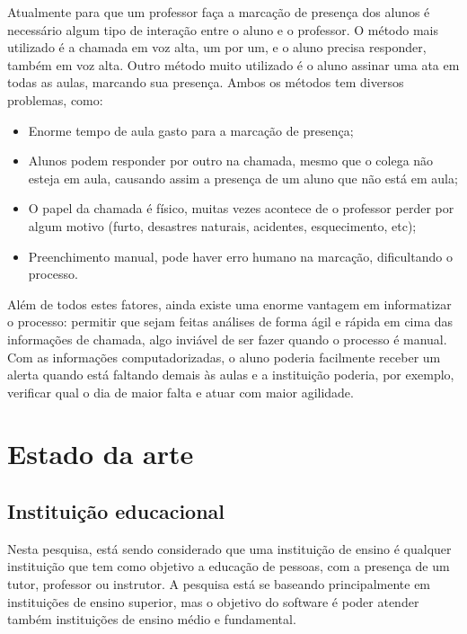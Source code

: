 \documentclass[
	12pt,
	oneside,
	a4paper,
	english,
	brazil,
]{abntex2}
\begin{document}
Atualmente para que um professor faça a marcação de presença dos alunos é necessário algum tipo de interação entre o aluno e o professor. O método mais utilizado é a chamada em voz alta, um por um, e o aluno precisa responder, também em voz alta. Outro método muito utilizado é o aluno assinar uma ata em todas as aulas, marcando sua presença. Ambos os métodos tem diversos problemas, como:

\begin{itemize}
    \item Enorme tempo de aula gasto para a marcação de presença;
    \item Alunos podem responder por outro na chamada, mesmo que o colega não esteja em aula, causando assim a presença de um aluno que não está em aula;
    \item O papel da chamada é físico, muitas vezes acontece de o professor perder por algum motivo (furto, desastres naturais, acidentes, esquecimento, etc);
    \item Preenchimento manual, pode haver erro humano na marcação, dificultando o processo.
\end{itemize}

Além de todos estes fatores, ainda existe uma enorme vantagem em informatizar o processo: permitir que sejam feitas análises de forma ágil e rápida em cima das informações de chamada, algo inviável de ser fazer quando o processo é manual. Com as informações computadorizadas, o aluno poderia facilmente receber um alerta quando está faltando demais às aulas e a instituição poderia, por exemplo, verificar qual o dia de maior falta e atuar com maior agilidade.



\chapter{Estado da arte}

\section{Instituição educacional}

Nesta pesquisa, está sendo considerado que uma instituição de ensino é qualquer instituição que tem como objetivo a educação de pessoas, com a presença de um tutor, professor ou instrutor. A pesquisa está se baseando principalmente em instituições de ensino superior, mas o objetivo do software é poder atender também instituições de ensino médio e fundamental.
\end{document}
